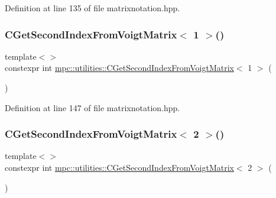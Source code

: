 Definition at line 135 of file matrixnotation.\+hpp.

\mbox{\label{namespacempc_1_1utilities_ac600a3a4e8be50854214d495b7672444}} 
\subsubsection{\texorpdfstring{C\+Get\+Second\+Index\+From\+Voigt\+Matrix$<$ 1 $>$()}{CGetSecondIndexFromVoigtMatrix< 1 >()}}
{\footnotesize\ttfamily template$<$$>$ \\
constexpr int \mbox{\hyperlink{namespacempc_1_1utilities_a094a324d81b996e8397336286264dfcd}{mpc\+::utilities\+::\+C\+Get\+Second\+Index\+From\+Voigt\+Matrix}}$<$ 1 $>$ (\begin{DoxyParamCaption}{ }\end{DoxyParamCaption})\hspace{0.3cm}{\ttfamily [inline]}}



Definition at line 147 of file matrixnotation.\+hpp.

\mbox{\label{namespacempc_1_1utilities_ace2b5aa12b0c53dfb13b277172f636d3}} 
\subsubsection{\texorpdfstring{C\+Get\+Second\+Index\+From\+Voigt\+Matrix$<$ 2 $>$()}{CGetSecondIndexFromVoigtMatrix< 2 >()}}
{\footnotesize\ttfamily template$<$$>$ \\
constexpr int \mbox{\hyperlink{namespacempc_1_1utilities_a094a324d81b996e8397336286264dfcd}{mpc\+::utilities\+::\+C\+Get\+Second\+Index\+From\+Voigt\+Matrix}}$<$ 2 $>$ (\begin{DoxyParamCaption}{ }\end{DoxyParamCaption})\hspace{0.3cm}{\ttfamily [inline]}}



